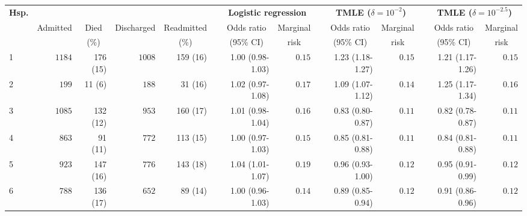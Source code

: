 \documentclass[]{article}\usepackage[]{graphicx}\usepackage[]{color}
\begin{document}
\begin{landscape}
\begin{table}[!tbp]
\end{table}
\begin{table}[!tbp]
\begin{center}
\begin{tabular}{lrrrrcrrcrrcrr}
\hline\hline
\multicolumn{1}{l}{\bfseries Hsp.}&\multicolumn{4}{c}{\bfseries }&\multicolumn{1}{c}{\bfseries }&\multicolumn{2}{c}{\bfseries Logistic regression}&\multicolumn{1}{c}{\bfseries }&\multicolumn{2}{c}{\bfseries TMLE ($\delta=10^{-2}$)}&\multicolumn{1}{c}{\bfseries }&\multicolumn{2}{c}{\bfseries TMLE ($\delta=10^{-2.5}$)}\tabularnewline
\cline{7-8} \cline{10-11} \cline{13-14}
\multicolumn{1}{l}{}&\multicolumn{1}{c}{Admitted}&\multicolumn{1}{c}{Died}&\multicolumn{1}{c}{Discharged}&\multicolumn{1}{c}{Readmitted}&\multicolumn{1}{c}{}&\multicolumn{1}{c}{Odds ratio}&\multicolumn{1}{c}{Marginal}&\multicolumn{1}{c}{}&\multicolumn{1}{c}{Odds ratio}&\multicolumn{1}{c}{Marginal}&\multicolumn{1}{c}{}&\multicolumn{1}{c}{Odds ratio}&\multicolumn{1}{c}{Marginal}\tabularnewline
&&\multicolumn{1}{c}{{\scriptsize (\%)}}&&\multicolumn{1}{c}{{\scriptsize (\%)}}&&\multicolumn{1}{c}{{\scriptsize (95\% CI)}}&\multicolumn{1}{c}{{\scriptsize risk}}&&\multicolumn{1}{c}{{\scriptsize (95\% CI)}}&\multicolumn{1}{c}{{\scriptsize risk}}&&\multicolumn{1}{c}{{\scriptsize (95\% CI)}}&\multicolumn{1}{c}{{\scriptsize risk}}\tabularnewline
\hline
1&$1184$&176 (15)&$1008$&159 (16)&&1.00 (0.98-1.03)&$0.15$&&1.23 (1.18-1.27)&$0.15$&&1.21 (1.17-1.26)&$0.15$\tabularnewline
2&$ 199$&11 (6)&$ 188$&31 (16)&&1.02 (0.97-1.08)&$0.17$&&1.09 (1.07-1.12)&$0.14$&&1.25 (1.17-1.34)&$0.16$\tabularnewline
3&$1085$&132 (12)&$ 953$&160 (17)&&1.01 (0.98-1.04)&$0.16$&&0.83 (0.80-0.87)&$0.11$&&0.82 (0.78-0.87)&$0.11$\tabularnewline
4&$ 863$&91 (11)&$ 772$&113 (15)&&1.00 (0.97-1.03)&$0.15$&&0.85 (0.81-0.88)&$0.11$&&0.84 (0.81-0.88)&$0.11$\tabularnewline
5&$ 923$&147 (16)&$ 776$&143 (18)&&1.04 (1.01-1.07)&$0.19$&&0.96 (0.93-1.00)&$0.12$&&0.95 (0.91-0.99)&$0.12$\tabularnewline
6&$ 788$&136 (17)&$ 652$&89 (14)&&1.00 (0.96-1.03)&$0.14$&&0.89 (0.85-0.94)&$0.12$&&0.91 (0.86-0.96)&$0.12$\tabularnewline

\end{tabular}
\end{center}
\end{table}
\end{landscape}
\end{document}

